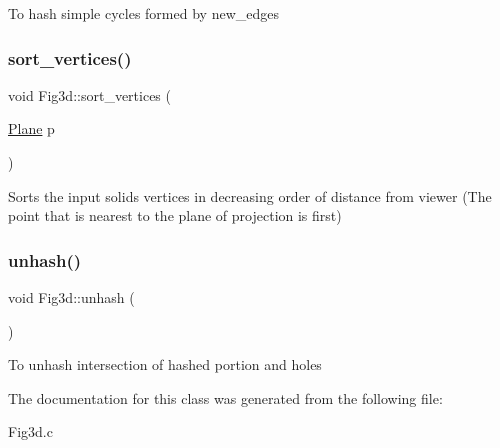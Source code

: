 To hash simple cycles formed by new\+\_\+edges \mbox{\label{class_fig3d_acea85aac6739bd0824921deede69590e}} 
\subsubsection{\texorpdfstring{sort\+\_\+vertices()}{sort\_vertices()}}
{\footnotesize\ttfamily void Fig3d\+::sort\+\_\+vertices (\begin{DoxyParamCaption}\item[{\mbox{\hyperlink{class_plane}{Plane}}}]{p }\end{DoxyParamCaption})}

Sorts the input solid\textquotesingle{}s vertices in decreasing order of distance from viewer (The point that is nearest to the plane of projection is first) \mbox{\label{class_fig3d_aa9265eb5e3c5ba3e57f303005e53d060}} 
\subsubsection{\texorpdfstring{unhash()}{unhash()}}
{\footnotesize\ttfamily void Fig3d\+::unhash (\begin{DoxyParamCaption}{ }\end{DoxyParamCaption})}

To unhash intersection of hashed portion and holes 

The documentation for this class was generated from the following file\+:\begin{DoxyCompactItemize}
\item 
Fig3d.\+c\end{DoxyCompactItemize}

